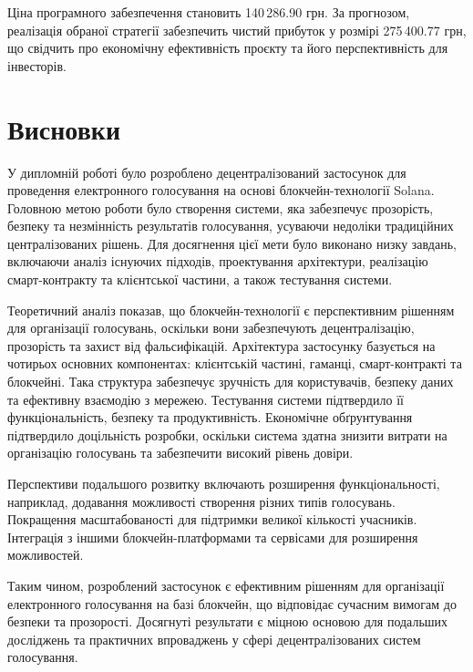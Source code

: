 \documentclass[14pt]{extreport}
\newcommand{\tocchap}[1]{
  \chapter*{#1}
  \addcontentsline{toc}{chapter}{\MakeUppercase{#1}}
}
\begin{document}
  Ціна програмного забезпечення становить 140\,286.90 грн. За прогнозом, реалізація обраної стратегії забезпечить чистий прибуток у розмірі 275\,400.77 грн, що свідчить про економічну ефективність проєкту та його перспективність для інвесторів.
  
  \tocchap{Висновки}
  
  У дипломній роботі було розроблено децентралізований застосунок для проведення електронного голосування на основі блокчейн-технології Solana. Головною метою роботи було створення системи, яка забезпечує прозорість, безпеку та незмінність результатів голосування, усуваючи недоліки традиційних централізованих рішень. Для досягнення цієї мети було виконано низку завдань, включаючи аналіз існуючих підходів, проектування архітектури, реалізацію смарт-контракту та клієнтської частини, а також тестування системи.
  
  Теоретичний аналіз показав, що блокчейн-технології є перспективним рішенням для організації голосувань, оскільки вони забезпечують децентралізацію, прозорість та захист від фальсифікацій. Архітектура застосунку базується на чотирьох основних компонентах: клієнтській частині, гаманці, смарт-контракті та блокчейні. Така структура забезпечує зручність для користувачів, безпеку даних та ефективну взаємодію з мережею. Тестування системи підтвердило її функціональність, безпеку та продуктивність. Економічне обґрунтування підтвердило доцільність розробки, оскільки система здатна знизити витрати на організацію голосувань та забезпечити високий рівень довіри.
  
  Перспективи подальшого розвитку включають розширення функціональності, наприклад, додавання можливості створення різних типів  голосувань. Покращення масштабованості для підтримки великої кількості учасників. Інтеграція з іншими блокчейн-платформами та сервісами для розширення можливостей.
  
  Таким чином, розроблений застосунок є ефективним рішенням для організації електронного голосування на базі блокчейн, що відповідає сучасним вимогам до безпеки та прозорості. Досягнуті результати є міцною основою для подальших досліджень та практичних впроваджень у сфері децентралізованих систем голосування.
  
\end{document}
